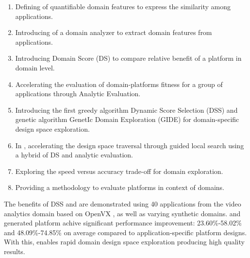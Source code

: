 \begin{enumerate}
 \item Defining of quantifiable domain features to express the similarity among applications.
 \item Introducing of a domain analyzer to extract domain features from applications.
 \item Introducing Domain Score (DS) to compare relative benefit of a platform in domain level.
 \item Accelerating the evaluation of domain-platforms fitness for a group of applications through Analytic Evaluation.
 \item Introducing the first greedy algorithm Dynamic Score Selection (DSS) and genetic algorithm GenetIc Domain Exploration (GIDE) for domain-specific design space exploration. 
 \item In \ga, accelerating the design space traversal through guided local search using a hybrid of DS and analytic evaluation.
 \item Exploring the speed versus accuracy trade-off for domain exploration.
 \item Providing a methodology to evaluate platforms in context of domains.
\end{enumerate}


The benefits of DSS and \ga are demonstrated using 40 applications from the video analytics domain based on OpenVX \cite{Intel, AMD}, as well as varying synthetic domains. 
 and \ga generated platform achive significant performance improvement: 23.60\%-58.02\% and 48.09\%-74.85\% on average compared to application-specific platform designs.
With this, \ga enables rapid domain design space exploration producing high quality results.

